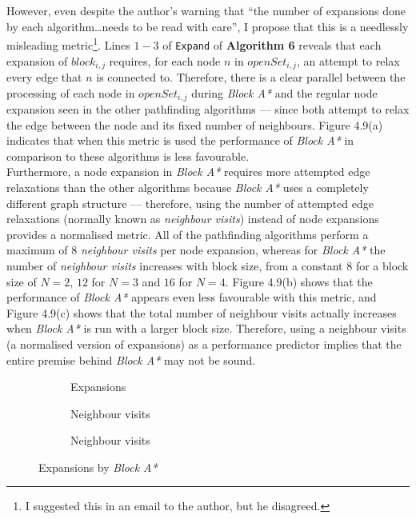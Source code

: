 \documentclass[12pt,notitlepage]{report}
\begin{document}
\noindent
However, even despite the author's warning that ``the number of expansions done by each algorithm\ldots needs to be read with care'', I propose that this is a needlessly misleading metric\footnote{I suggested this in an email to the author, but he disagreed.}. Lines $1-3$ of {\tt Expand} of {\bfseries Algorithm 6} reveals that each expansion of $block_{i,j}$ requires, for each node $n$ in $openSet_{i,j}$, an attempt to relax every edge that $n$ is connected to. Therefore, there is a clear parallel between the processing of each node in $openSet_{i,j}$ during {\em Block A*} and the regular node expansion seen in the other pathfinding algorithms --- since both attempt to relax the edge between the node and its fixed number of neighbours. Figure 4.9(a) indicates that when this metric is used the performance of {\em Block A*} in comparison to these algorithms is less favourable.\\

\noindent
Furthermore, a node expansion in {\em Block A*} requires more attempted edge relaxations than the other algorithms because {\em Block A*} uses a completely different graph structure --- therefore, using the number of attempted edge relaxations (normally known as {\em neighbour visits}) instead of node expansions provides a normalised metric. All of the pathfinding algorithms perform a maximum of $8$ {\em neighbour visits} per node expansion, whereas for {\em Block A*} the number of {\em neighbour visits} increases with block size, from a constant $8$ for a block size of $N=2$, $12$ for $N=3$ and $16$ for $N=4$. Figure 4.9(b) shows that the performance of {\em Block A*} appears even less favourable with this metric, and Figure 4.9(c) shows that the total number of neighbour visits actually increases when {\em Block A*} is run with a larger block size. Therefore, using a neighbour visits (a normalised version of expansions) as a performance predictor implies that the entire premise behind {\em Block A*} may not be sound.\\

\begin{figure}
\centering
  \begin{subfigure}{0.32\textwidth}
  \centering
  
  \caption{Expansions}
  \end{subfigure}
  \begin{subfigure}{0.32\textwidth}
  \centering
  
  \caption{Neighbour visits}
  \end{subfigure}
  \begin{subfigure}{0.32\textwidth}
  \centering
  
  \caption{Neighbour visits}
  \end{subfigure}
\caption{Expansions by {\em Block A*}}
\end{figure}
\end{document}

